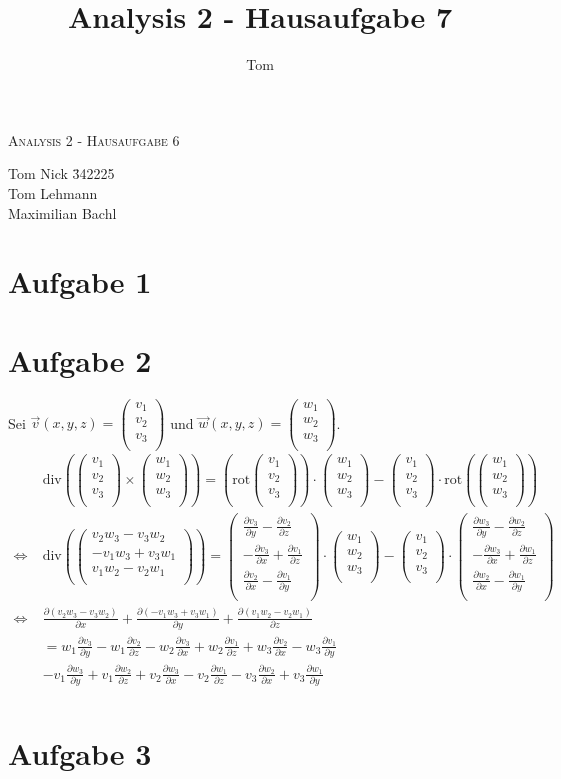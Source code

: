 \documentclass[10pt,a4paper,parskip=half]{scrartcl}
\author{Tom}
\title{Analysis 2 - Hausaufgabe 7}
\newcommand{\vecthree}[3]{\begin{pmatrix}#1\\#2\\#3\\\end {pmatrix}}
\begin{document}
\begin{center}
\textsc{\Large{Analysis 2 - Hausaufgabe 6}} \\
\end{center}
\begin{tabbing}
Tom Nick \hspace{1.4cm}\= 342225\\
Tom Lehmann\\
Maximilian Bachl
\end{tabbing}
\section*{Aufgabe 1}
\section*{Aufgabe 2}
Sei $\vec v(x,y,z) = \vecthree{v_1}{v_2}{v_3}$ und $\vec w(x,y,z) = \vecthree{w_1}{w_2}{w_3}$. 
\begin{align*}
&\text{div}\left(\vecthree{v_1}{v_2}{v_3} \times \vecthree{w_1}{w_2}{w_3}\right) = \left( \text{rot} \vecthree{v_1}{v_2}{v_3} \right) \cdot \vecthree{w_1}{w_2}{w_3} - \vecthree{v_1}{v_2}{v_3} \cdot \text{rot}\left( \vecthree{w_1}{w_2}{w_3} \right) \\
\Leftrightarrow\; &\text{div}\left(\vecthree{v_2w_3 - v_3w_2}{-v_1w_3 + v_3w_1}{v_1w_2 - v_2w_1}\right) = \vecthree{\frac{\partial v_3}{\partial y} - \frac{\partial v_2}{\partial z}}{- \frac{\partial v_3}{\partial x} + \frac{\partial v_1}{\partial z}}{\frac{\partial v_2}{\partial x} - \frac{\partial v_1}{\partial y}} \cdot \vecthree{w_1}{w_2}{w_3} - \vecthree{v_1}{v_2}{v_3} \cdot \vecthree{\frac{\partial w_3}{\partial y} - \frac{\partial w_2}{\partial z}}{- \frac{\partial w_3}{\partial x} + \frac{\partial w_1}{\partial z}}{\frac{\partial w_2}{\partial x} - \frac{\partial w_1}{\partial y}} \\
\Leftrightarrow\; &\frac{\partial (v_2w_3 - v_3w_2)}{\partial x} + \frac{\partial (-v_1w_3 + v_3w_1)}{\partial y} + \frac{\partial (v_1w_2 - v_2w_1)}{\partial z}\\
&= w_1\frac{\partial v_3}{\partial y} - w_1\frac{\partial v_2}{\partial z} - w_2\frac{\partial v_3}{\partial x} + w_2\frac{\partial v_1}{\partial z} + w_3\frac{\partial v_2}{\partial x} - w_3\frac{\partial v_1}{\partial y}\\
 &- v_1\frac{\partial w_3}{\partial y} + v_1\frac{\partial w_2}{\partial z} + v_2\frac{\partial w_3}{\partial x} - v_2\frac{\partial w_1}{\partial z} - v_3\frac{\partial w_2}{\partial x} + v_3\frac{\partial w_1}{\partial y}\\
\end{align*}
\section*{Aufgabe 3}
\end{document}
